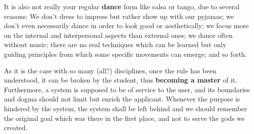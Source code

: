 It is also not really your regular \textbf{dance} form like salsa or tango, due to several reasons: We don't dress to impress but rather show up with our pyjamas; we don't even necessarily dance in order to look good or aesthetically; we focus more on the internal and interpersonal aspects than external ones; we dance often without music; there are no real techniques which can be learned but only guiding principles from which some specific movements can emerge; and so forth.

As it is the case with so many (all?) disciplines, once the rule has been understood, it can be broken by the student, thus \textbf{becoming a master} of it.
Furthermore, a system is supposed to be of service to the user, and its boundaries and dogma should not limit but enrich the applicant.
Whenever the purpose is hindered by the system, the system shall be left behind and we should remember the original goal which was there in the first place, and not to serve the gods we created.
